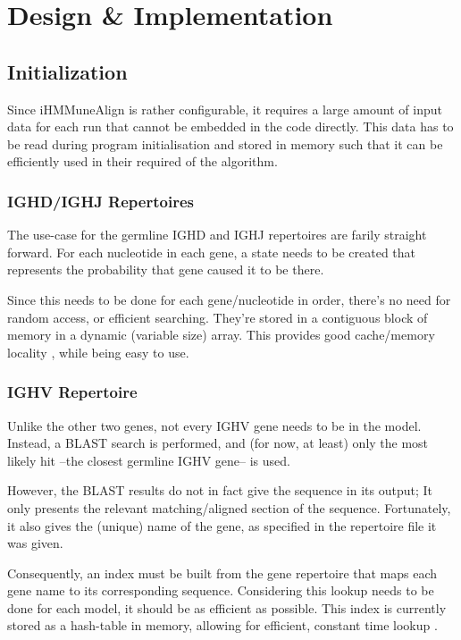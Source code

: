 \chapter{Design \& Implementation}

\section{Initialization}
Since iHMMuneAlign is rather configurable, it requires a large amount of input data for each run that cannot be embedded in the code directly. This data has to be read during program initialisation and stored in memory such that it can be efficiently used in their required of the algorithm.

\subsection{IGHD/IGHJ Repertoires}
The use-case for the germline IGHD and IGHJ repertoires are farily straight forward. For each nucleotide in each gene, a state needs to be created that represents the probability that gene caused it to be there.

Since this needs to be done for each gene/nucleotide in order, there's no need for random access, or efficient searching. They're stored in a contiguous block of memory in a dynamic (variable size) array. This provides good cache/memory locality \autocite{cache-locality}, while being easy to use.

\subsection{IGHV Repertoire}
\label{sec:v-repertoire}
Unlike the other two genes, not every IGHV gene needs to be in the model. Instead, a BLAST search is performed, and (for now, at least) only the most likely hit --the closest germline IGHV gene-- is used.

However, the BLAST results do not in fact give the sequence in its output; It only presents the relevant matching/aligned section of the sequence. Fortunately, it also gives the (unique) name of the gene, as specified in the repertoire file it was given.

Consequently, an index must be built from the gene repertoire that maps each gene name to its corresponding sequence. Considering this lookup needs to be done for each model, it should be as efficient as possible. This index is currently stored as a hash-table in memory, allowing for efficient, constant time lookup \autocite{hash-table}.

